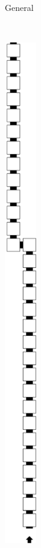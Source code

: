 \begin{itemize}
\begin{figure}[H]
\begin{subfigure}[t]{0.24\textwidth}
                \caption{\label{fig:pre_warp_general} General }
            \end{subfigure}%
            ~
            \begin{subfigure}[t]{0.24\textwidth}
                \centering
                \includegraphics[width=0.15\textwidth]{warping/pre_warp_case1_digit1_msr}

\end{subfigure}
\end{figure}
\end{itemize}
